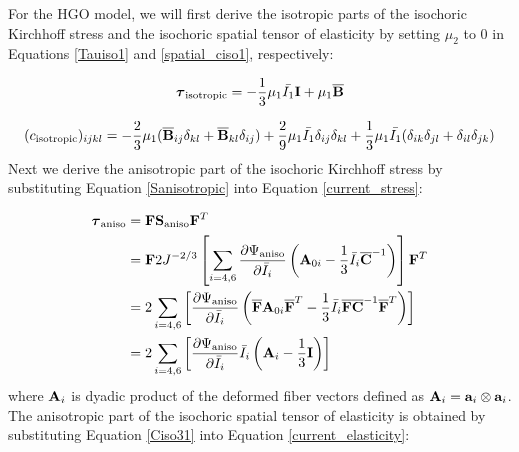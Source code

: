 \begin{appendices}
For the HGO model, we will first derive the isotropic parts of the isochoric Kirchhoff stress and the isochoric spatial tensor of elasticity by setting $\mu_2$ to $0$ in Equations \ref{Tauiso1} and \ref{spatial_ciso1}, respectively:

\begin{equation} \label{Tauisotropic}
\boldsymbol{\tau}_\mathrm{isotropic} = - \frac{1}{3}\mu_1\bar{I_1}\bold{I} + \mu_1{\overline{\bold{B}}}
\end{equation}

\begin{equation} \label{spatial_cisotropic}
(c_\mathrm{isotropic})_{ijkl} 
= - \frac{2}{3}\mu_1({\overline{\bold{B}}}_{ij}\delta_{kl} + {\overline{\bold{B}}}_{kl}\delta_{ij}) 
+ \frac{2}{9}\mu_1\bar{I_1}  \delta_{ij}\delta_{kl}
+ \frac{1}{3}\mu_1\bar{I_1} (\delta_{ik}\delta_{jl} + \delta_{il}\delta_{jk})
\end{equation} 
Next we derive the anisotropic part of the isochoric Kirchhoff stress by substituting Equation \ref{Sanisotropic} into Equation \ref{current_stress}:

\begin{equation} \label{Tauiso3}
\begin{split}
\boldsymbol{\tau}_\mathrm{aniso} 
&= \bold{F}\bold{S}_\mathrm{aniso}{\bold{F}}^T \\
&= \bold{F} 2J^{-2/3} \left[\sum_{i = 4, 6}\frac{\partial{\Psi_\mathrm{aniso}}}{\partial{\bar{I}_i}}  \left(\bold{A}_{0i} - \frac{1}{3}\bar{I}_i\overline{\bold{C}}^{-1} \right)\right] {\bold{F}}^T \\
&= 2\sum_{i = 4, 6}\left[\frac{\partial{\Psi_\mathrm{aniso}}}{\partial{\bar{I}_i}} \left({\overline{\bold{F}}}\bold{A}_{0i}{\overline{\bold{F}}}^T - \frac{1}{3}\bar{I}_i{\overline{\bold{F}}}\overline{\bold{C}}^{-1}{\overline{\bold{F}}}^T \right)\right] \\
&= 2\sum_{i = 4, 6}\left[\frac{\partial{\Psi_\mathrm{aniso}}}{\partial{\bar{I}_i}}\bar{I}_i \left(\bold{A}_{i} - \frac{1}{3}\bold{I} \right)\right]
\end{split}
\end{equation}
where $\bold{A}_i$ is dyadic product of the deformed fiber vectors defined as $\bold{A}_i = \bold{a}_i \otimes \bold{a}_i$. 
The anisotropic part of the isochoric spatial tensor of elasticity is obtained by substituting Equation \ref{Ciso31} into Equation \ref{current_elasticity}:


\end{appendices}
